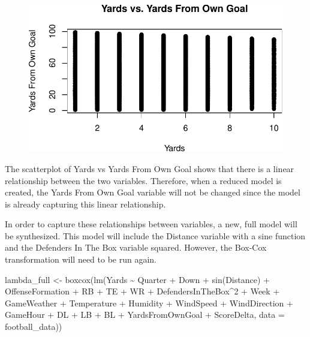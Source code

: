 \documentclass[
  super,
  preprint,
  3p]{elsarticle}
\newenvironment{Shaded}{\begin{snugshade}}{\end{snugshade}}
\newcommand{\AttributeTok}[1]{\textcolor[rgb]{0.40,0.45,0.13}{#1}}
\newcommand{\DecValTok}[1]{\textcolor[rgb]{0.68,0.00,0.00}{#1}}
\newcommand{\FunctionTok}[1]{\textcolor[rgb]{0.28,0.35,0.67}{#1}}
\newcommand{\NormalTok}[1]{\textcolor[rgb]{0.00,0.23,0.31}{#1}}
\newcommand{\OtherTok}[1]{\textcolor[rgb]{0.00,0.23,0.31}{#1}}
\newcommand{\SpecialCharTok}[1]{\textcolor[rgb]{0.37,0.37,0.37}{#1}}
\begin{document}
\begin{figure}[H]

{\centering \includegraphics{project_report_files/figure-pdf/unnamed-chunk-28-1.pdf}

}

\end{figure}

The scatterplot of Yards vs Yards From Own Goal shows that there is a
linear relationship between the two variables. Therefore, when a reduced
model is created, the Yards From Own Goal variable will not be changed
since the model is already capturing this linear relationship.

In order to capture these relationships between variables, a new, full
model will be synthesized. This model will include the Distance variable
with a sine function and the Defenders In The Box variable squared.
However, the Box-Cox transformation will need to be run again.

\begin{Shaded}
\begin{Highlighting}[]
\NormalTok{lambda\_full }\OtherTok{\textless{}{-}} \FunctionTok{boxcox}\NormalTok{(}\FunctionTok{lm}\NormalTok{(Yards }\SpecialCharTok{\textasciitilde{}}\NormalTok{ Quarter }\SpecialCharTok{+}\NormalTok{ Down }\SpecialCharTok{+} \FunctionTok{sin}\NormalTok{(Distance) }\SpecialCharTok{+}\NormalTok{ OffenseFormation }\SpecialCharTok{+}\NormalTok{ RB }\SpecialCharTok{+}\NormalTok{ TE }\SpecialCharTok{+}\NormalTok{ WR }\SpecialCharTok{+}\NormalTok{ DefendersInTheBox}\SpecialCharTok{\^{}}\DecValTok{2} \SpecialCharTok{+}\NormalTok{ Week }\SpecialCharTok{+}\NormalTok{ GameWeather }\SpecialCharTok{+}\NormalTok{ Temperature }\SpecialCharTok{+}\NormalTok{ Humidity }\SpecialCharTok{+}\NormalTok{ WindSpeed }\SpecialCharTok{+}\NormalTok{ WindDirection }\SpecialCharTok{+}\NormalTok{ GameHour }\SpecialCharTok{+}\NormalTok{ DL }\SpecialCharTok{+}\NormalTok{ LB }\SpecialCharTok{+}\NormalTok{ BL }\SpecialCharTok{+}\NormalTok{ YardsFromOwnGoal }\SpecialCharTok{+}\NormalTok{ ScoreDelta, }\AttributeTok{data =}\NormalTok{ football\_data))}
\end{Highlighting}
\end{Shaded}
\end{document}
